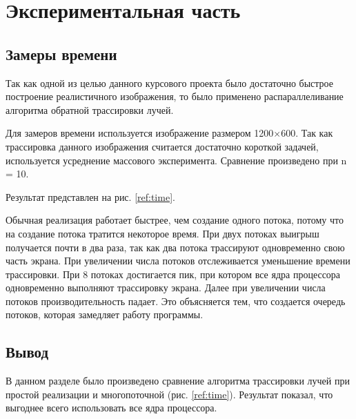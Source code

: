 \chapter{Экспериментальная часть}

\section{Замеры времени}

Так как одной из целью данного курсового проекта было достаточно быстрое
построение реалистичного изображения, то было применено распараллеливание
алгоритма обратной трассировки лучей.

Для замеров времени используется изображение размером 1200$\times$600.
Так как трассировка данного изображения считается достаточно короткой
задачей, используется усреднение массового эксперимента.
Сравнение произведено при n = 10.

Результат представлен на рис. \ref{ref:time}.

\begin{figure}[ht!]
\end{figure}

\newpage

Обычная реализация работает быстрее, чем создание одного потока,
потому что на создание потока тратится некоторое время.
При двух потоках выигрыш получается почти в два раза, так как два потока
трассируют одновременно свою часть экрана.
При увеличении числа потоков отслеживается уменьшение времени трассировки.
При 8 потоках достигается пик, при котором все ядра процессора одновременно
выполняют трассировку экрана.
Далее при увеличении числа потоков производительность падает.
Это объясняется тем, что создается очередь потоков, которая замедляет
работу программы.

\section{Вывод}

В данном разделе было произведено сравнение алгоритма трассировки лучей
при простой реализации и многопоточной (рис. \ref{ref:time}).
Результат показал, что выгоднее всего использовать все ядра процессора.